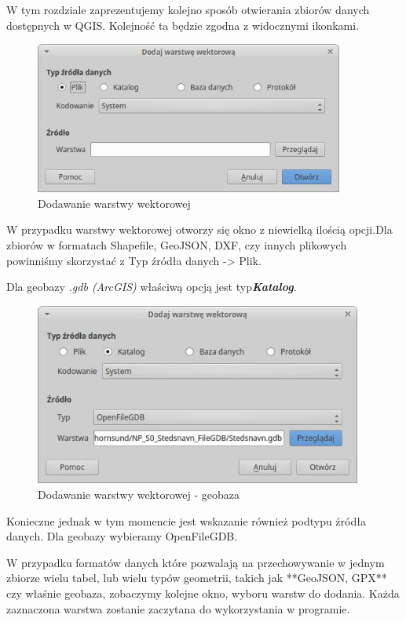 \documentclass[12pt,a4paper]{book}
\begin{document}
W tym rozdziale zaprezentujemy kolejno sposób otwierania zbiorów danych dostępnych w QGIS. Kolejność ta będzie zgodna z widocznymi ikonkami.
\begin{figure}[ht]
	\centering
	\includegraphics[height=5cm]{002-dodaj-wektor.jpg}
	\caption{Dodawanie warstwy wektorowej}
\end{figure}

W przypadku warstwy wektorowej otworzy się okno z niewielką ilością opcji.Dla zbiorów w formatach Shapefile, GeoJSON, DXF, czy innych plikowych powinniśmy skorzystać z Typ źródła danych -{\textgreater} Plik.

Dla geobazy \textit{.gdb (ArcGIS)} właściwą opcją jest typ\textit{\textbf{Katalog}}.

\begin{figure}[ht]
	\centering
	\includegraphics[height=6cm]{002-dodaj-ogdb.png}
	\caption{Dodawanie warstwy wektorowej - geobaza}
\end{figure}

Konieczne jednak w tym momencie jest wskazanie również podtypu źródła danych. Dla geobazy wybieramy OpenFileGDB.

W przypadku formatów danych które pozwalają na przechowywanie w jednym zbiorze wielu tabel, lub wielu typów geometrii, takich jak **GeoJSON, GPX** czy właśnie geobaza, zobaczymy kolejne okno, wyboru warstw do dodania. Każda zaznaczona warstwa zostanie zaczytana do wykorzystania w programie.
\end{document}
